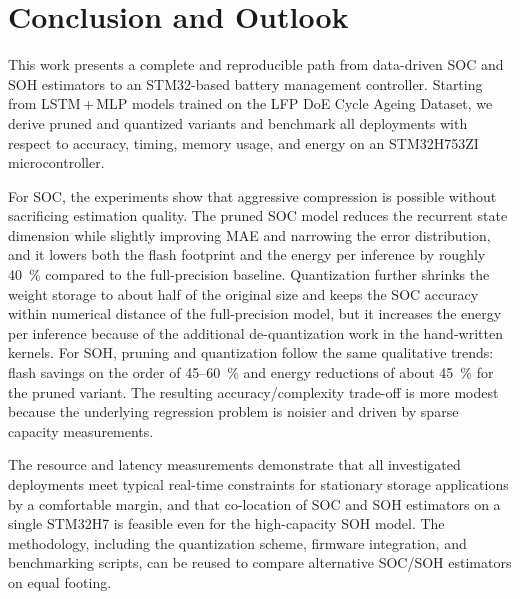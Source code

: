 \documentclass[final,3p,times]{elsarticle}
\begin{document}
\section{Conclusion and Outlook}
This work presents a complete and reproducible path from data-driven SOC and SOH estimators to an STM32-based battery management controller. Starting from LSTM\,+\,MLP models trained on the LFP DoE Cycle Ageing Dataset, we derive pruned and quantized variants and benchmark all deployments with respect to accuracy, timing, memory usage, and energy on an STM32H753ZI microcontroller.

For SOC, the experiments show that aggressive compression is possible without sacrificing estimation quality. The pruned SOC model reduces the recurrent state dimension while slightly improving MAE and narrowing the error distribution, and it lowers both the flash footprint and the energy per inference by roughly 40~\% compared to the full-precision baseline. Quantization further shrinks the weight storage to about half of the original size and keeps the SOC accuracy within numerical distance of the full-precision model, but it increases the energy per inference because of the additional de-quantization work in the hand-written kernels. For SOH, pruning and quantization follow the same qualitative trends: flash savings on the order of 45--60~\% and energy reductions of about 45~\% for the pruned variant. The resulting accuracy/complexity trade-off is more modest because the underlying regression problem is noisier and driven by sparse capacity measurements.

The resource and latency measurements demonstrate that all investigated deployments meet typical real-time constraints for stationary storage applications by a comfortable margin, and that co-location of SOC and SOH estimators on a single STM32H7 is feasible even for the high-capacity SOH model. The methodology, including the quantization scheme, firmware integration, and benchmarking scripts, can be reused to compare alternative SOC/SOH estimators on equal footing.
\end{document}
